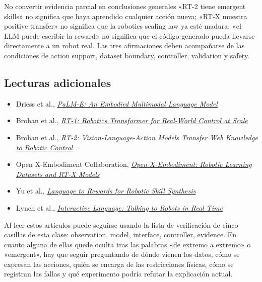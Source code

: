 \documentclass[a4paper]{article}
\begin{document}
\begin{warningbox}{No convertir evidencia parcial en conclusiones generales}
«RT-2 tiene emergent skills» no significa que haya aprendido cualquier acción nueva; «RT-X muestra positive transfer» no significa que la robotics scaling law ya esté madura; «el LLM puede escribir la reward» no significa que el código generado pueda llevarse directamente a un robot real. Las tres afirmaciones deben acompañarse de las condiciones de action support, dataset boundary, controller, validation y safety.
\end{warningbox}

\subsection{Lecturas adicionales}

\begin{itemize}
  \item Driess et al., \href{https://arxiv.org/abs/2303.03378}{\emph{PaLM-E: An Embodied Multimodal Language Model}}
  \item Brohan et al., \href{https://arxiv.org/abs/2212.06817}{\emph{RT-1: Robotics Transformer for Real-World Control at Scale}}
  \item Brohan et al., \href{https://arxiv.org/abs/2307.15818}{\emph{RT-2: Vision-Language-Action Models Transfer Web Knowledge to Robotic Control}}
  \item Open X-Embodiment Collaboration, \href{https://arxiv.org/abs/2310.08864}{\emph{Open X-Embodiment: Robotic Learning Datasets and RT-X Models}}
  \item Yu et al., \href{https://arxiv.org/abs/2306.08647}{\emph{Language to Rewards for Robotic Skill Synthesis}}
  \item Lynch et al., \href{https://arxiv.org/abs/2206.04717}{\emph{Interactive Language: Talking to Robots in Real Time}}
\end{itemize}

Al leer estos artículos puede seguirse usando la lista de verificación de cinco casillas de esta clase: observation, model, interface, controller, evidence. En cuanto alguna de ellas quede oculta tras las palabras «de extremo a extremo» o «emergent», hay que seguir preguntando de dónde vienen los datos, cómo se expresan las acciones, quién se encarga de las restricciones físicas, cómo se registran las fallas y qué experimento podría refutar la explicación actual.
\end{document}
